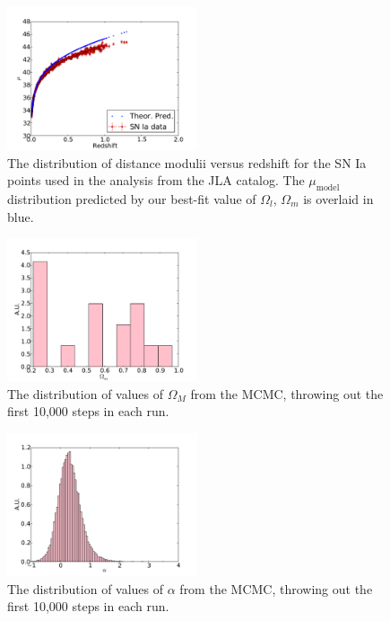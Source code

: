 \documentclass[aps,prl,reprint]{revtex4-1}
\begin{document}
\begin{figure}
 \includegraphics[width=0.5\textwidth]{../plots/mu.pdf}
\caption{\label{fig:mu}The distribution of distance modulii versus redshift for the SN Ia points used in the analysis from the JLA catalog. The $\mu_\text{model}$ distribution predicted by our best-fit value of $\Omega_l$, $\Omega_m$ is overlaid in blue.}
\end{figure}
\begin{figure}
 \includegraphics[width=0.5\textwidth]{../plots/om_hist.pdf}
\caption{\label{fig:omhist}The distribution of values of $\Omega_M$ from the MCMC, throwing out the first 10,000 steps in each run.}
\end{figure}
\begin{figure}
 \includegraphics[width=0.5\textwidth]{../plots/alpha_hist.pdf}
\caption{\label{fig:alphahist}The distribution of values of $\alpha$ from the MCMC, throwing out the first 10,000 steps in each run.}
\end{figure}
\end{document}
